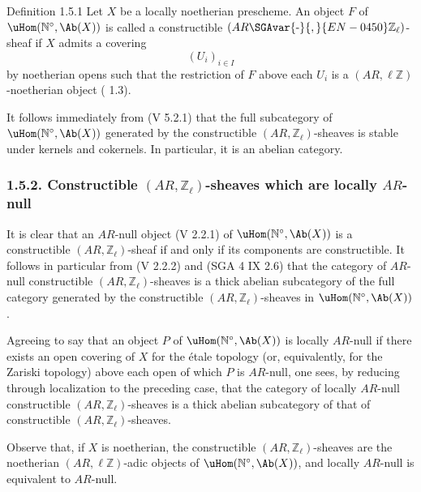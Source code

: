 \begin{statement}{Definition 1.5.1}
Let \(X\) be a locally noetherian prescheme. An object \(F\) of \(\uHom(\mathbb N^\circ,\Ab(X))\) is called a constructible \((AR\SGAvar{\text{-}}{,}{EN-0450}\mathbb Z_\ell)\)-sheaf if \(X\) admits a covering
\[
(U_i)_{i\in I}
\]
by noetherian opens such that the restriction of \(F\) above each \(U_i\) is a \((AR,\ell\mathbb Z)\)-noetherian object ( 1.3).
\end{statement}

It follows immediately from (V 5.2.1) that the full subcategory of \(\uHom(\mathbb N^\circ,\Ab(X))\) generated by the constructible \((AR,\mathbb Z_\ell)\)-sheaves is stable under kernels and cokernels. In particular, it is an abelian category.

\subsubsection*{1.5.2. Constructible \((AR,\mathbb Z_\ell)\)-sheaves which are locally \(AR\)-null}

It is clear that an \(AR\)-null object (V 2.2.1) of \(\uHom(\mathbb N^\circ,\Ab(X))\) is a constructible \((AR,\mathbb Z_\ell)\)-sheaf if and only if its components are constructible. It follows in particular from (V 2.2.2) and (SGA 4 IX 2.6) that the category of \(AR\)-null constructible \((AR,\mathbb Z_\ell)\)-sheaves is a thick abelian subcategory of the full category generated by the constructible \((AR,\mathbb Z_\ell)\)-sheaves in \(\uHom(\mathbb N^\circ,\Ab(X))\).

Agreeing to say that an object \(P\) of \(\uHom(\mathbb N^\circ,\Ab(X))\) is locally \(AR\)-null if there exists an open covering of \(X\) for the étale topology (or, equivalently, for the Zariski topology) above each open of which \(P\) is \(AR\)-null, one sees, by reducing through localization to the preceding case, that the category of locally \(AR\)-null constructible \((AR,\mathbb Z_\ell)\)-sheaves is a thick abelian subcategory of that of constructible \((AR,\mathbb Z_\ell)\)-sheaves.

Observe that, if \(X\) is noetherian, the constructible \((AR,\mathbb Z_\ell)\)-sheaves are the noetherian \((AR,\ell\mathbb Z)\)-adic objects of \(\uHom(\mathbb N^\circ,\Ab(X))\), and locally \(AR\)-null is equivalent to \(AR\)-null.

